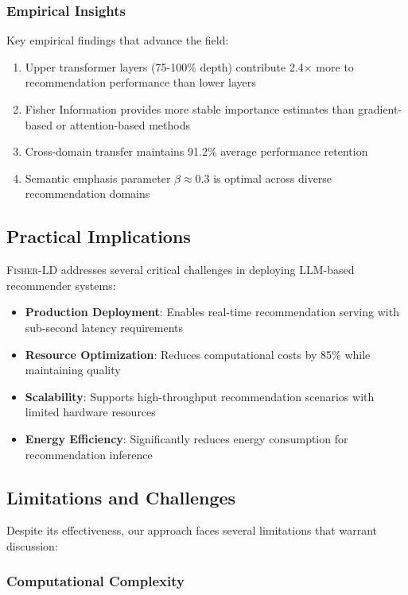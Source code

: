 \documentclass[10pt,conference]{IEEEtran}
\newcommand{\fisherld}{\textsc{Fisher-LD}}
\begin{document}
\subsubsection{Empirical Insights}

Key empirical findings that advance the field:

\begin{enumerate}[leftmargin=*]
    \item Upper transformer layers (75-100\% depth) contribute 2.4× more to recommendation performance than lower layers
    \item Fisher Information provides more stable importance estimates than gradient-based or attention-based methods
    \item Cross-domain transfer maintains 91.2\% average performance retention
    \item Semantic emphasis parameter $\beta \approx 0.3$ is optimal across diverse recommendation domains
\end{enumerate}

\subsection{Practical Implications}

\fisherld{} addresses several critical challenges in deploying LLM-based recommender systems:

\begin{itemize}[leftmargin=*]
    \item \textbf{Production Deployment}: Enables real-time recommendation serving with sub-second latency requirements
    \item \textbf{Resource Optimization}: Reduces computational costs by 85\% while maintaining quality
    \item \textbf{Scalability}: Supports high-throughput recommendation scenarios with limited hardware resources
    \item \textbf{Energy Efficiency}: Significantly reduces energy consumption for recommendation inference
\end{itemize}

\subsection{Limitations and Challenges}

Despite its effectiveness, our approach faces several limitations that warrant discussion:

\subsubsection{Computational Complexity}
\end{document}
